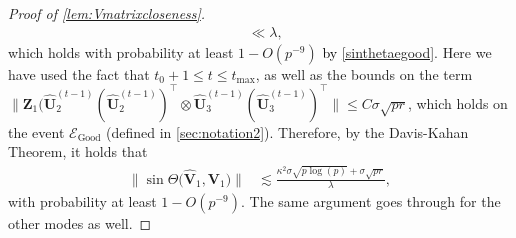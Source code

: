 \documentclass[10pt]{article}
\newcommand{\0}{{\mathbf{0}}}
\newcommand{\1}{{\mathbf{1}}}
\renewcommand{\t}{^{\top}}
\newcommand{\uhat}{\mathbf{\hat{U}}}
\renewcommand{\hat}{\widehat}
\renewcommand{\hat}{\widehat}
\begin{document}
\begin{proof}[Proof of \cref{lem:Vmatrixcloseness}]
\begin{align}
    &\ll \lambda, \nonumber
\end{align}
which holds with probability at least $1 - O(p^{-9})$ \textcolor{black}{by \eqref{sinthetaegood}}.  Here we have used the fact that $t_0 + 1 \leq t \leq t_{\max}$, as well as the bounds on the term $\|\mathbf{Z}_1 \big( \uhat_2^{(t-1)} (\uhat_2^{(t-1)})\t \otimes \uhat_3^{(t-1)} (\uhat_3^{(t-1)})\t \| \leq C \sigma \sqrt{pr}$, which holds on the event $\mathcal{E}_{\mathrm{Good}}$ (defined in \cref{sec:notation2}).  Therefore, by the Davis-Kahan Theorem, it holds that
\begin{align*}
    \| \sin\Theta\big( \mathbf{\hat V}_1 ,\mathbf{V}_1 \big) \| &\lesssim \frac{\kappa^2 \sigma \sqrt{p\log(p)} + \sigma \sqrt{pr}}{\lambda},
\end{align*}
with probability at least $1 - O(p^{-9})$. The same argument goes through for the other modes as well. 


\end{proof}
\end{document}
